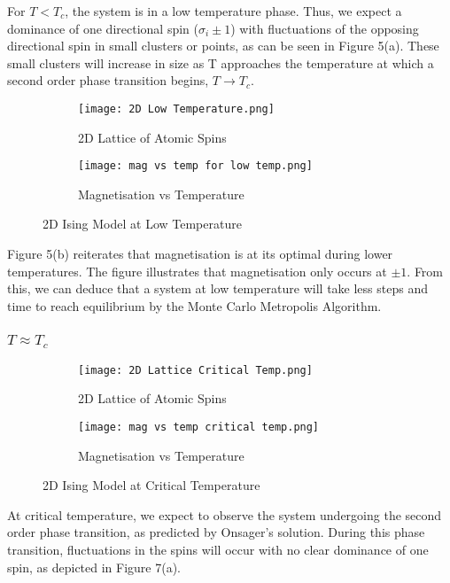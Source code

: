 \documentclass[a4paper]{article}
\begin{document}
For $T < T_{c}$, the system is in a low temperature phase. Thus, we expect a dominance of one directional spin ($\sigma_{i} \pm 1$) with fluctuations of the opposing directional spin in small clusters or points, as can be seen in Figure 5(a). These small clusters will increase in size as T approaches the temperature at which a second order phase transition begins, $T \rightarrow T_{c}$.

\begin{figure}[h]
\centering
\begin{subfigure}{0.4\textwidth}
\texttt{[image: 2D Low Temperature.png]} 
\caption{2D Lattice of Atomic Spins}
\label{fig:subim1}
\end{subfigure}
\begin{subfigure}{0.5\textwidth}
\texttt{[image: mag vs temp for low temp.png]}
\caption{Magnetisation vs Temperature}
\label{fig:subim2}
\end{subfigure}
\caption{2D Ising Model at Low Temperature}
\label{fig:image2}
\end{figure}

Figure 5(b) reiterates that magnetisation is at its optimal during lower temperatures. The figure illustrates that magnetisation only occurs at $\pm{1}$. From this, we can deduce that a system at low temperature will take less steps and time to reach equilibrium by the Monte Carlo Metropolis Algorithm.

\subsubsection{$T \approx T_{c}$}

\begin{figure}[h]
\centering
\begin{subfigure}{0.4\textwidth}
\texttt{[image: 2D Lattice Critical Temp.png]} 
\caption{2D Lattice of Atomic Spins}
\label{fig:subim1}
\end{subfigure}
\begin{subfigure}{0.5\textwidth}
\texttt{[image: mag vs temp critical temp.png]}
\caption{Magnetisation vs Temperature}
\label{fig:subim2}
\end{subfigure}
\caption{2D Ising Model at Critical Temperature}
\label{fig:image2}
\end{figure}

At critical temperature, we expect to observe the system undergoing the second order phase transition, as predicted by Onsager's solution. During this phase transition, fluctuations in the spins will occur with no clear dominance of one spin, as depicted in Figure 7(a).
\end{document}
